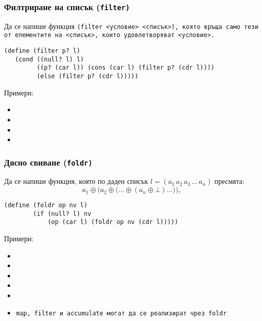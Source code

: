 \documentclass{beamer}
\begin{document}
\begin{frame}[fragile]
  \frametitle{Филтриране на списък (\tt{filter})}

  Да се напише функция \tt{(filter }<условие> <списък>\tt), която връща само тези от елементите на <списък>, които удовлетворяват <условие>.

\pause
\small

\begin{verbatim}
(define (filter p? l)
   (cond ((null? l) l)
         ((p? (car l)) (cons (car l) (filter p? (cdr l))))
         (else (filter p? (cdr l)))))
\end{verbatim}

\pause

  Примери:
  \begin{itemize}[<+->]
  \item {}
  \item {}
  \item {}
  \item {}
  \end{itemize}

\end{frame}

\begin{frame}[fragile]
  \frametitle{Дясно свиване (\tt{foldr})}

  Да се напише функция, която по даден списък $l = (a_1\,a_2\,a_3\,\ldots\,a_n)$ пресмята:
  \begin{equation*}
    a_1 \oplus \Big(a_2 \oplus \big(\ldots \oplus (a_n \oplus \bot) \ldots\big)\Big),
  \end{equation*}

  \pause

\begin{verbatim}
(define (foldr op nv l)
        (if (null? l) nv
            (op (car l) (foldr op nv (cdr l)))))
\end{verbatim}

  \pause
  Примери:
  \small
  \begin{itemize}[<+->]
  \item {}
  \item {}
  \item {}
  \item {}
  \item {}
  \item \tt{map}, \tt{filter} и \tt{accumulate} могат да се реализират чрез \tt{foldr}
  \end{itemize}

\end{frame}
\end{document}
